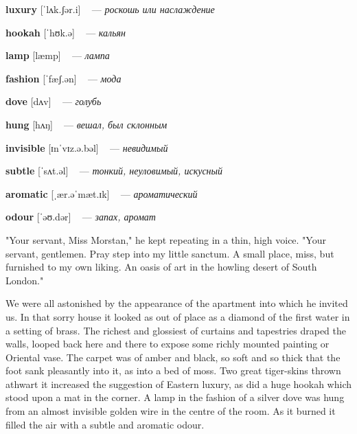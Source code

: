 \documentclass[a4paper,oneside,12pt]{amsart}
\begin{document}
{{\bf luxury } [ˈlʌk.ʃər.i] ~ --- \emph{ роскошь или наслаждение }

{\bf hookah } [ˈhʊk.ə] ~ --- \emph{ кальян }

{\bf lamp } [læmp] ~ --- \emph{ лампа }

{\bf fashion } [ˈfæʃ.ən] ~ --- \emph{ мода }

{\bf dove } [dʌv] ~ --- \emph{ голубь }

{\bf hung } [hʌŋ] ~ --- \emph{ вешал, был склонным }

{\bf invisible } [ɪnˈvɪz.ə.bəl] ~ --- \emph{ невидимый }

{\bf subtle } [ˈsʌt.əl] ~ --- \emph{ тонкий, неуловимый, искусный }

{\bf aromatic } [ˌær.əˈmæt.ɪk] ~ --- \emph{ ароматический }

{\bf odour } [ˈəʊ.dər] ~ --- \emph{ запах, аромат }

} \vspace{6mm} {\Large 

 
"Your servant, Miss Morstan," he kept repeating in a thin, high voice. "Your servant, gentlemen. Pray step into my little sanctum. A small place, miss, but furnished to my own liking. An oasis of art in the howling desert of South London."

We were all astonished by the appearance of the apartment into which he invited us. In that sorry house it looked as out of place as a diamond of the first water in a setting of brass. The richest and glossiest of curtains and tapestries draped the walls, looped back here and there to expose some richly mounted painting or Oriental vase. The carpet was of amber and black, so soft and so thick that the foot sank pleasantly into it, as into a bed of moss. Two great tiger-skins thrown athwart it increased the suggestion of Eastern luxury, as did a huge hookah which stood upon a mat in the corner. A lamp in the fashion of a silver dove was hung from an almost invisible golden wire in the centre of the room. As it burned it filled the air with a subtle and aromatic odour.
\\ } 
\end{document}
